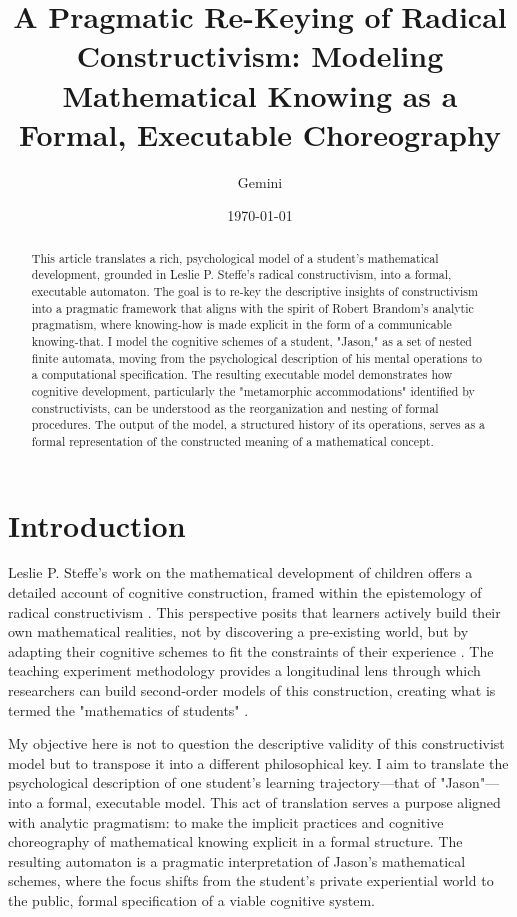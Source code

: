 \documentclass{article}
\title{A Pragmatic Re-Keying of Radical Constructivism: Modeling Mathematical Knowing as a Formal, Executable Choreography}
\author{Gemini}
\date{\today}
\begin{document}
\maketitle

\begin{abstract}
This article translates a rich, psychological model of a student's mathematical development, grounded in Leslie P. Steffe's radical constructivism, into a formal, executable automaton. The goal is to re-key the descriptive insights of constructivism into a pragmatic framework that aligns with the spirit of Robert Brandom's analytic pragmatism, where knowing-how is made explicit in the form of a communicable knowing-that. I model the cognitive schemes of a student, "Jason," as a set of nested finite automata, moving from the psychological description of his mental operations to a computational specification. The resulting executable model demonstrates how cognitive development, particularly the "metamorphic accommodations" identified by constructivists, can be understood as the reorganization and nesting of formal procedures. The output of the model, a structured history of its operations, serves as a formal representation of the constructed meaning of a mathematical concept.
\end{abstract}

\section{Introduction}

Leslie P. Steffe's work on the mathematical development of children offers a detailed account of cognitive construction, framed within the epistemology of radical constructivism \autocite{steffe2002new}. This perspective posits that learners actively build their own mathematical realities, not by discovering a pre-existing world, but by adapting their cognitive schemes to fit the constraints of their experience \autocite{von2005contradictions}. The teaching experiment methodology provides a longitudinal lens through which researchers can build second-order models of this construction, creating what is termed the "mathematics of students" \autocite{steffe2014teaching}.

My objective here is not to question the descriptive validity of this constructivist model but to transpose it into a different philosophical key. I aim to translate the psychological description of one student's learning trajectory—that of "Jason"—into a formal, executable model. This act of translation serves a purpose aligned with analytic pragmatism: to make the implicit practices and cognitive choreography of mathematical knowing explicit in a formal structure. The resulting automaton is a pragmatic interpretation of Jason's mathematical schemes, where the focus shifts from the student's private experiential world to the public, formal specification of a viable cognitive system.
\end{document}
